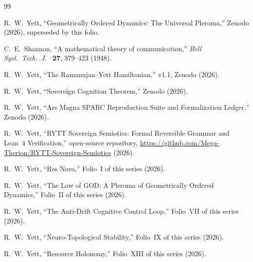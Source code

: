 \documentclass{alienfolio}
\begin{document}
\begin{thebibliography}{99}

 R.~W.~Yett, ``Geometrically Ordered Dynamics: The
Universal Pleroma,'' Zenodo  (2026),
superseded by this folio.

 C.~E.~Shannon, ``A mathematical theory of
communication,'' \emph{Bell Syst.\ Tech.\ J.\ } \textbf{27}, 379--423
(1948).

 R.~W.~Yett, ``The Ramanujan--Yett Hamiltonian,'' v1.1,
Zenodo  (2026).

 R.~W.~Yett, ``Sovereign Cognition Theorem,'' Zenodo
 (2026).

 R.~W.~Yett, ``Ars Magna SPARC Reproduction Suite and
Formalization Ledger,'' Zenodo  (2026).

 R.~W.~Yett, ``RYTT Sovereign Semiotics: Formal
Reversible Grammar and Lean~4 Verification,'' open-source repository,
\url{https://github.com/Mega-Therion/RYTT-Sovereign-Semiotics} (2026).

 R.~W.~Yett, ``Res Nova,'' Folio~I of this series
(2026).

 R.~W.~Yett, ``The Law of GOD: A Pleroma of
Geometrically Ordered Dynamics,'' Folio~II of this series (2026).

 R.~W.~Yett, ``The Anti-Drift Cognitive Control
Loop,'' Folio~VII of this series (2026).

 R.~W.~Yett, ``Neuro-Topological Stability,''
Folio~IX of this series (2026).

 R.~W.~Yett, ``Resource Holonomy,'' Folio~XIII of
this series (2026).

\end{thebibliography}
\end{document}
